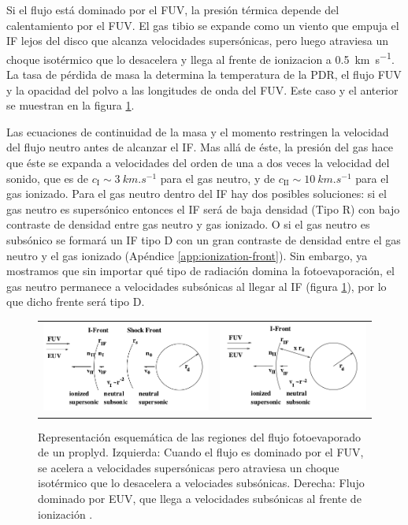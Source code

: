 Si el flujo está dominado por el FUV, la presión térmica depende del calentamiento por el FUV. El gas tibio se expande como un viento que empuja el IF lejos del disco que alcanza velocidades supersónicas, pero luego atraviesa un choque isotérmico que lo desacelera y llega al frente de ionizacion a \SI{0.5}{km.s^{-1}}. La tasa de pérdida de masa la determina la temperatura de la PDR, el flujo FUV y la opacidad del polvo a las longitudes de onda del FUV. Este caso y el anterior se muestran en la figura \ref{fig:EUV-FUV-IF}.

Las ecuaciones de continuidad de la masa y el momento restringen la velocidad del flujo neutro antes de alcanzar el IF. Mas allá de éste, la presión del gas hace que éste se expanda a velocidades del orden de una a dos veces la velocidad del sonido, que es de $c_{\mathrm{I}} \sim \SI{3}{km.s^{-1}}$ para el gas neutro, y de $c_{\mathrm{II}} \sim \SI{10}{km.s^{-1}}$ para el gas ionizado. Para el gas neutro dentro del IF hay dos posibles soluciones: si el gas neutro es supersónico entonces el IF será de baja densidad (Tipo R) con bajo contraste de densidad entre gas neutro y gas ionizado. O si el gas neutro es subsónico se formará un IF tipo D con un gran contraste de densidad entre el gas neutro y el gas ionizado (Apéndice \ref{app:ionization-front}). Sin embargo, ya mostramos que sin importar qué tipo de radiación domina la fotoevaporación, el gas neutro permanece a velocidades subsónicas al llegar al IF (figura \ref{fig:EUV-FUV-IF}), por lo que dicho frente será tipo D.

\begin{figure}
  \centering
    \begin{tabular}{cc}
      \includegraphics[width=0.5\linewidth]{./Figures/Johnstone-2} &
      \includegraphics[width=0.5\linewidth]{./Figures/Johnstone-3}
    \end{tabular}
    \caption[Representación esquemática del flujo fotoevaporado]{Representación esquemática de las regiones del flujo fotoevaporado de un proplyd. Izquierda: Cuando el flujo es dominado por el FUV, se acelera a velocidades supersónicas pero atraviesa un choque isotérmico que lo desacelera a velociades subsónicas. Derecha: Flujo dominado por EUV, que llega a velocidades subsónicas al frente de ionización \citep{Johnstone:1998}.}
    \label{fig:EUV-FUV-IF}
  \end{figure}
  
